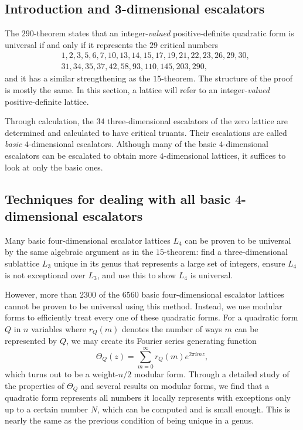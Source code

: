 \documentclass{article}
\begin{document}
\subsection{Introduction and 3-dimensional escalators}
The $290$-theorem \cite{twoninety} states that an integer-\emph{valued} positive-definite quadratic form is universal if and only if it represents the $29$ critical numbers
\[\begin{split}
    &1,2,3,5,6,7,10,13,14,15,17,19,21,22,23,26,29,30, \\
    &31,34,35,37,42,58,93,110,145,203,290,
\end{split}\] %
and it has a similar strengthening as the $15$-theorem.
The structure of the proof is mostly the same.
In this section, a lattice will refer to an integer-\emph{valued} positive-definite lattice.

Through calculation, the $34$ three-dimensional escalators of the zero lattice are determined and calculated to have critical truants.
Their escalations are called \emph{basic} $4$-dimensional escalators. Although many of the basic $4$-dimensional escalators can be escalated to obtain more $4$-dimensional lattices, it suffices to look at only the basic ones.

\subsection{Techniques for dealing with all basic $4$-dimensional escalators}
Many basic four-dimensional escalator lattices $L_4$ can be proven to be universal by the same algebraic argument as in the $15$-theorem:
find a three-dimensional sublattice $L_3$ unique in its genus that represents a large set of integers, ensure $L_4$ is not exceptional over $L_3$, and use this to show $L_4$ is universal.

However, more than $2300$ of the $6560$ basic four-dimensional escalator lattices cannot be proven to be universal using this method.
Instead, we use modular forms to efficiently treat every one of these quadratic forms. For a quadratic form $Q$ in $n$ variables where $r_Q(m)$ denotes the number of ways $m$ can be represented by $Q$, we may create its Fourier series generating function
\[\Theta_Q(z) = \sum_{m = 0}^{\infty} r_Q(m) e^{2\pi i m z},\]
which turns out to be a weight-$n/2$ modular form. Through a detailed study of the properties of $\Theta_Q$ and several results on modular forms, we find that a quadratic form represents all numbers it locally represents with exceptions only up to a certain number $N$, which can be computed and is small enough. This is nearly the same as the previous condition of being unique in a genus.
\end{document}

